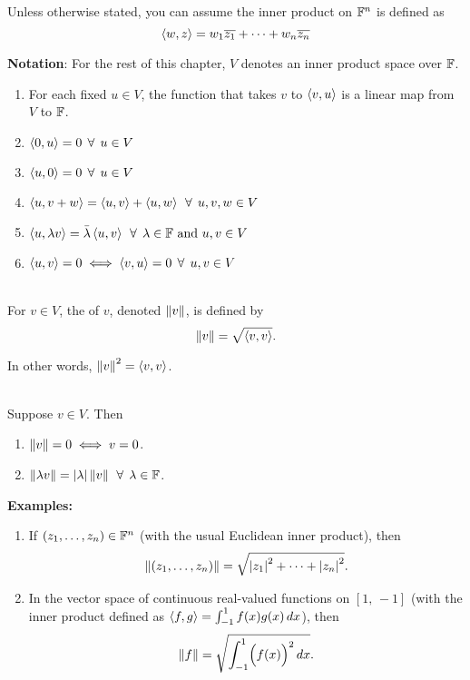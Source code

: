 \nl Unless otherwise stated, you can assume the inner product on $\mathbb{F}^n$ is defined as $$\left\langle{w,z}\right\rangle = w_1 \overline{z_1} + \cdots + w_n \overline{z_n}$$

\nnl \textbf{Notation}: For the rest of this chapter, $V$ denotes an inner product space over $\mathbb{F}$.

\begin{enumerate}[label=(\alph*)]
    \item For each fixed $u \in V$, the function that takes $v$ to $\left\langle{v,u}\right\rangle$ is a linear map from $V$ to $\mathbb{F}$.
    \item $\left\langle{0,u}\right\rangle = 0 \;\, \forall \;\, u \in V$
    \item $\left\langle{u,0}\right\rangle = 0 \;\, \forall \;\, u \in V$
    \item $\left\langle{u, v+w}\right\rangle = \left\langle{u,v}\right\rangle + \left\langle{u,w}\right\rangle \;\, \forall \;\, u,v,w \in V$
    \item $\left\langle{u,\lambda v}\right\rangle = \bar{\lambda} \left\langle{u,v}\right\rangle \;\, \forall \;\, \lambda \in \mathbb{F} \text{ and } u,v\in V$
    \item $\left\langle{u,v}\right\rangle = 0 \iff \left\langle{v,u}\right\rangle = 0 \;\, \forall \;\, u,v \in V$
\end{enumerate}

\\For $v \in V$, the  of $v$, denoted $\left\| {v} \right\|$, is defined by
$$\left\| {v} \right\| = \sqrt{\left\langle{v,v}\right\rangle}.$$

\nl In other words, $\left\| {v} \right\|^2 = \left\langle{v,v}\right\rangle$.

\\
Suppose $v \in V$. Then 
\begin{enumerate}[label=(\alph*)]
    \item $\left\| {v} \right\| = 0 \iff v = 0$.
    \item $\left\| {\lambda v} \right\| = \left| {\lambda} \right|\left\| {v} \right\| \;\, \forall \;\, \lambda \in \mathbb{F}$.
\end{enumerate}

\nl \textbf{Examples:}

\begin{enumerate}[label=(\alph*)]
    \item If $({z}_1, \dots, {z}_n) \in \mathbb{F}^n$ (with the usual Euclidean inner product), then
    $$\left\| {({z}_1, \dots, {z}_n)} \right\| = \sqrt{\left| {z_1} \right|^2 + \cdots + \left| {z_n} \right|^2}.$$
    \item In the vector space of continuous real-valued functions on $[1,\,-1]$ (with the inner product defined as $\left\langle{f,g}\right\rangle = \int_{-1}^1 f(x)g(x)\,dx$), then
    $$\left\| {f} \right\| = \displaystyle \sqrt{\int_{-1}^1 \Bigl(f(x)\Bigr)^2\,dx}.$$
\end{enumerate}

